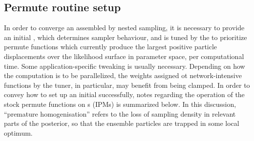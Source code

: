 \subsection{Permute routine setup}
\label{ssec:adhoc}
In order to converge an assembled  by nested sampling, it is necessary to provide an initial , which determines sampler behaviour, and is tuned by the  to prioritize permute functions which currently produce the largest positive particle displacements over the likelihood surface in parameter space, per computational time. Some application-specific tweaking is usually necessary. Depending on how the computation is to be parallelized, the weights assigned ot network-intensive functions by the tuner, in particular, may benefit from being clamped. In order to convey how to set up an initial  successfully, notes regarding the operation of the stock permute functions on s (IPMs) is summarized below. In this discussion, ``premature homogenisation'' refers to the loss of sampling density in relevant parts of the posterior, so that the ensemble particles are trapped in some local optimum.

